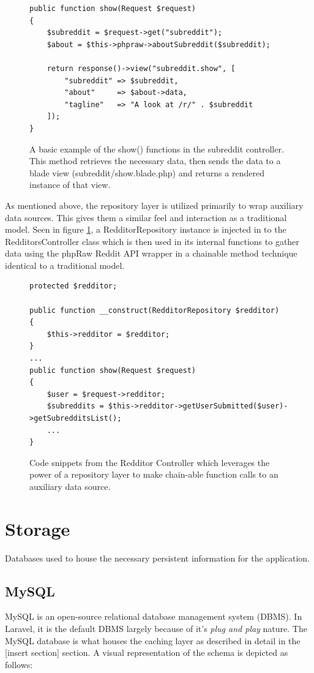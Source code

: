 \documentclass[msc,oneside]{ubcthesis}%
\begin{document}
\begin{figure}[!htb]
\begin{lstlisting}
public function show(Request $request)
{
	$subreddit = $request->get("subreddit");
	$about = $this->phpraw->aboutSubreddit($subreddit);
	
	return response()->view("subreddit.show", [
		"subreddit" => $subreddit,
		"about"     => $about->data,
		"tagline"   => "A look at /r/" . $subreddit
	]);
}
\end{lstlisting}
\caption[Example of Controller]{
A basic example of the show() functions in the subreddit controller. This method retrieves the necessary data, then sends the data to a blade view (subreddit/show.blade.php) and returns a rendered instance of that view.}
\end{figure}

As mentioned above, the repository layer is utilized primarily to wrap auxiliary data sources. This gives them a similar feel and interaction as a traditional model. Seen in figure \ref{fig:repository}, a RedditorRepository instance is injected in to the RedditorsController class which is then used in its internal functions to gather data using the phpRaw Reddit API wrapper in a chainable method technique identical to a traditional model.
\begin{figure}[!htb]
\begin{lstlisting}
protected $redditor;

public function __construct(RedditorRepository $redditor)
{
	$this->redditor = $redditor;
}
...
public function show(Request $request)
{
	$user = $request->redditor;
	$subreddits = $this->redditor->getUserSubmitted($user)->getSubredditsList();
	...
}
\end{lstlisting}
\caption[Example of Repository]{
Code snippets from the Redditor Controller which leverages the power of a repository layer to make chain-able function calls to an auxiliary data source.}
\label{fig:repository}
\end{figure}

\section{Storage}
Databases used to house the necessary persistent information for the application.

\subsection{MySQL}
MySQL is an open-source relational database management system (DBMS). In Laravel, it is the default DBMS largely because of it's \textit{plug and play} nature. The MySQL database is what houses the caching layer as described in detail in the [insert section] section. A visual representation of the schema is depicted as follows:
\end{document}
